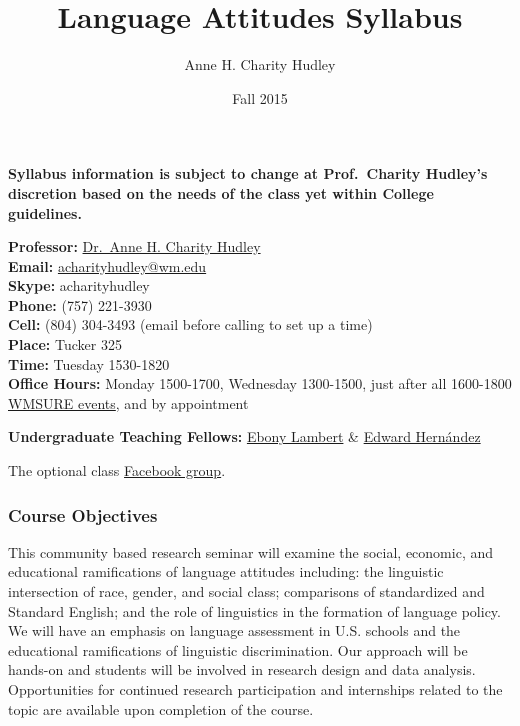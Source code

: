 \documentclass[]{article}
\date{}
\begin{document}
\title{Language Attitudes Syllabus}
\author{Anne H. Charity Hudley}
\date{Fall 2015}

\maketitle

\textbf{Syllabus information is subject to change at Prof.~Charity
Hudley's discretion based on the needs of the class yet within College
guidelines.}

\textbf{Professor:} \href{http://annecharityhudley.com/}{Dr.~Anne H.
Charity Hudley}\\
\textbf{Email:}
\href{maito:acharityhudley@wm.edu}{acharityhudley@wm.edu}\\
\textbf{Skype:} acharityhudley\\
\textbf{Phone:} (757) 221-3930\\
\textbf{Cell:} (804) 304-3493 (email before calling to set up a time)\\
\textbf{Place:} Tucker 325\\
\textbf{Time:} Tuesday 1530-1820\\
\textbf{Office Hours:} Monday 1500-1700, Wednesday 1300-1500, just after
all 1600-1800 \href{}{WMSURE events}, and by appointment

\textbf{Undergraduate Teaching Fellows:}
\href{mailto:ealambert@email.wm.edu}{Ebony Lambert} \&
\href{mailto:ehernandez@email.wm.edu}{Edward Hernández}

The optional class
\href{https://www.facebook.com/groups/WMlanguageattitudes/}{Facebook
group}.

\subsubsection{Course Objectives}\label{course-objectives}

This community based research seminar will examine the social, economic,
and educational ramifications of language attitudes including: the
linguistic intersection of race, gender, and social class; comparisons
of standardized and Standard English; and the role of linguistics in the
formation of language policy. We will have an emphasis on language
assessment in U.S. schools and the educational ramifications of
linguistic discrimination. Our approach will be hands-on and students
will be involved in research design and data analysis. Opportunities for
continued research participation and internships related to the topic
are available upon completion of the course.
\end{document}
